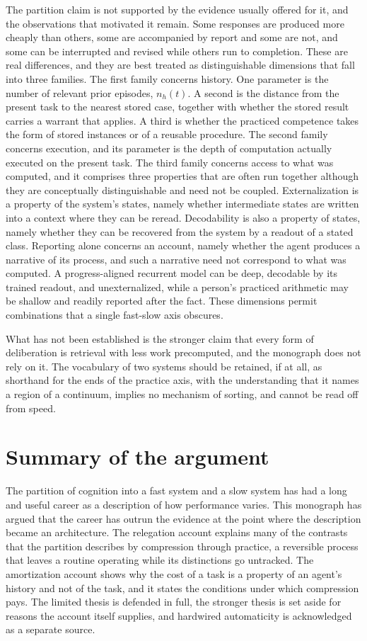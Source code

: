 \documentclass[11pt]{report}
\theoremstyle{remark}
\theoremstyle{definition}
\begin{document}
The partition claim is not supported by the evidence usually offered for it, and the observations that motivated it remain. Some responses are produced more cheaply than others, some are accompanied by report and some are not, and some can be interrupted and revised while others run to completion. These are real differences, and they are best treated as distinguishable dimensions that fall into three families. The first family concerns history. One parameter is the number of relevant prior episodes, $n_h(t)$. A second is the distance from the present task to the nearest stored case, together with whether the stored result carries a warrant that applies. A third is whether the practiced competence takes the form of stored instances or of a reusable procedure. The second family concerns execution, and its parameter is the depth of computation actually executed on the present task. The third family concerns access to what was computed, and it comprises three properties that are often run together although they are conceptually distinguishable and need not be coupled. Externalization is a property of the system's states, namely whether intermediate states are written into a context where they can be reread. Decodability is also a property of states, namely whether they can be recovered from the system by a readout of a stated class. Reporting alone concerns an account, namely whether the agent produces a narrative of its process, and such a narrative need not correspond to what was computed. A progress-aligned recurrent model can be deep, decodable by its trained readout, and unexternalized, while a person's practiced arithmetic may be shallow and readily reported after the fact. These dimensions permit combinations that a single fast-slow axis obscures.

What has not been established is the stronger claim that every form of deliberation is retrieval with less work precomputed, and the monograph does not rely on it. The vocabulary of two systems should be retained, if at all, as shorthand for the ends of the practice axis, with the understanding that it names a region of a continuum, implies no mechanism of sorting, and cannot be read off from speed.

\section{Summary of the argument}


The partition of cognition into a fast system and a slow system has had a long and useful career as a description of how performance varies. This monograph has argued that the career has outrun the evidence at the point where the description became an architecture. The relegation account explains many of the contrasts that the partition describes by compression through practice, a reversible process that leaves a routine operating while its distinctions go untracked. The amortization account shows why the cost of a task is a property of an agent's history and not of the task, and it states the conditions under which compression pays. The limited thesis is defended in full, the stronger thesis is set aside for reasons the account itself supplies, and hardwired automaticity is acknowledged as a separate source.
\end{document}
